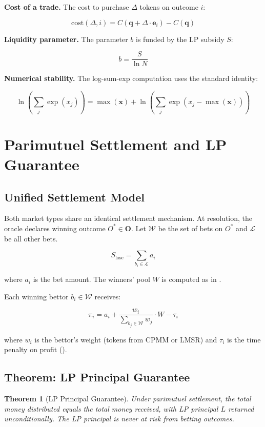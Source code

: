 \documentclass{ledger}
\theoremstyle{plain}
\newtheorem{theorem}{Theorem}
\theoremstyle{remark}
\begin{document}
\textbf{Cost of a trade.} The cost to purchase $\Delta$ tokens on outcome $i$:

\[
\text{cost}(\Delta, i) = C(\mathbf{q} + \Delta \cdot \mathbf{e}_i) - C(\mathbf{q})
\]

\textbf{Liquidity parameter.} The parameter $b$ is funded by the LP subsidy $S$:

\[
b = \frac{S}{\ln N}
\]

\textbf{Numerical stability.} The log-sum-exp computation uses the standard
identity:

\[
\ln\left(\sum_j \exp(x_j)\right) = \max(\mathbf{x}) +
\ln\left(\sum_j \exp(x_j - \max(\mathbf{x}))\right)
\]

\section{Parimutuel Settlement and LP Guarantee}\label{sec:settlement}

\subsection{Unified Settlement Model}\label{sec:unified}

Both market types share an identical settlement mechanism. At resolution, the
oracle declares winning outcome $O^* \in \mathbf{O}$. Let $\mathcal{W}$ be the
set of bets on $O^*$ and $\mathcal{L}$ be all other bets.

\[
S_{\text{lose}} = \sum_{b_i \in \mathcal{L}} a_i
\]

where $a_i$ is the bet amount. The winners' pool $W$ is computed as in
.

Each winning bettor $b_i \in \mathcal{W}$ receives:

\[
\pi_i = a_i + \frac{w_i}{\sum_{b_j \in \mathcal{W}} w_j} \cdot W - \tau_i
\]

where $w_i$ is the bettor's weight (tokens from CPMM or LMSR) and $\tau_i$ is
the time penalty on profit ().

\subsection{Theorem: LP Principal Guarantee}\label{sec:thm1}

\begin{theorem}[LP Principal Guarantee]\label{thm:lp}
Under parimutuel settlement, the total money distributed equals the total money
received, with LP principal $L$ returned unconditionally. The LP principal is
never at risk from betting outcomes.
\end{theorem}
\end{document}
